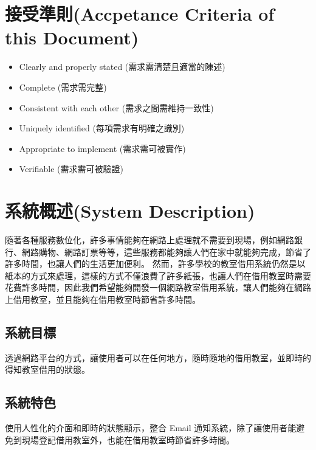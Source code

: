 \documentclass{article}
\begin{document}
\newpage

\section[接受準則(ACCEPTANCE CRITERIA OF THIS DOCUMENT)]{接受準則(Accpetance Criteria of this Document)}


\begin{itemize}
	\color{blue}
	\item Clearly and properly stated (需求需清楚且適當的陳述)
	\item Complete (需求需完整)
	\item Consistent with each other (需求之間需維持一致性)
	\item Uniquely identified (每項需求有明確之識別)
	\item Appropriate to implement (需求需可被實作)
	\item Verifiable (需求需可被驗證)
\end{itemize}

\newpage

\section[系統概述(SYSTEM DESCRIPTION)]{系統概述(System Description)}

隨著各種服務數位化，許多事情能夠在網路上處理就不需要到現場，例如網路銀行、網路購物、網路訂票等等，這些服務都能夠讓人們在家中就能夠完成，節省了許多時間，也讓人們的生活更加便利。
然而，許多學校的教室借用系統仍然是以紙本的方式來處理，這樣的方式不僅浪費了許多紙張，也讓人們在借用教室時需要花費許多時間，因此我們希望能夠開發一個網路教室借用系統，讓人們能夠在網路上借用教室，並且能夠在借用教室時節省許多時間。

\subsection{系統目標}

透過網路平台的方式，讓使用者可以在任何地方，隨時隨地的借用教室，並即時的得知教室借用的狀態。

\subsection{系統特色}

使用人性化的介面和即時的狀態顯示，整合 Email 通知系統，除了讓使用者能避免到現場登記借用教室外，也能在借用教室時節省許多時間。

\bigskip
\end{document}
